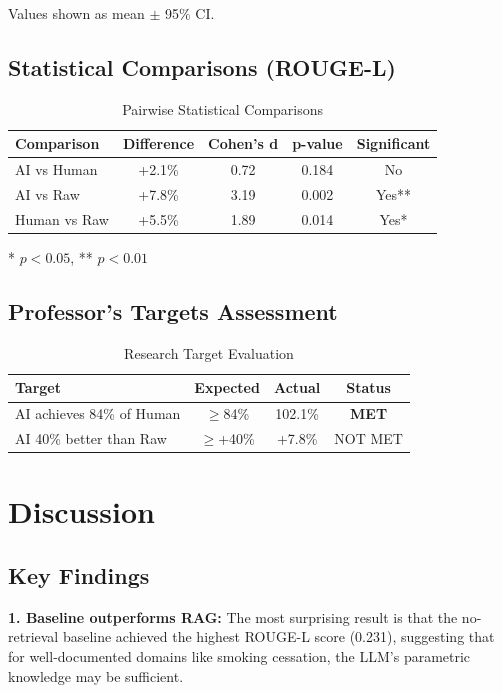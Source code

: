 \documentclass{article}
\begin{document}
Values shown as mean $\pm$ 95\% CI.

\subsection{Statistical Comparisons (ROUGE-L)}

\begin{table}[h]
\centering
\caption{Pairwise Statistical Comparisons}
\begin{tabular}{lcccc}
\toprule
Comparison & Difference & Cohen's d & p-value & Significant \\
\midrule
AI vs Human & +2.1\% & 0.72 & 0.184 & No \\
AI vs Raw & +7.8\% & 3.19 & 0.002 & Yes** \\
Human vs Raw & +5.5\% & 1.89 & 0.014 & Yes* \\
\bottomrule
\end{tabular}
\label{tab:statistical}
\end{table}

* $p < 0.05$, ** $p < 0.01$

\subsection{Professor's Targets Assessment}

\begin{table}[h]
\centering
\caption{Research Target Evaluation}
\begin{tabular}{lccc}
\toprule
Target & Expected & Actual & Status \\
\midrule
AI achieves 84\% of Human & $\geq$84\% & 102.1\% & \textbf{MET} \\
AI 40\% better than Raw & $\geq$+40\% & +7.8\% & NOT MET \\
\bottomrule
\end{tabular}
\label{tab:targets}
\end{table}

\section{Discussion}

\subsection{Key Findings}

\textbf{1. Baseline outperforms RAG:} The most surprising result is that the no-retrieval baseline achieved the highest ROUGE-L score (0.231), suggesting that for well-documented domains like smoking cessation, the LLM's parametric knowledge may be sufficient.
\end{document}
